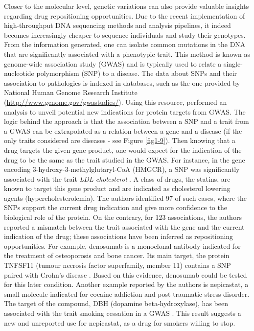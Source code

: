 Closer to the molecular level, genetic variations can also provide valuable insights regarding drug repositioning opportunities. Due to the recent implementation of high-throughput DNA sequencing methods and analysis pipelines, it indeed becomes increasingly cheaper to sequence individuals and study their genotypes. From the information generated, one can isolate common mutations in the DNA that are significantly associated with a phenotypic trait. This method is known as genome-wide association study (GWAS) and is typically used to relate a single-nucleotide polymorphism (SNP) to a disease. The data about SNPs and their association to pathologies is indexed in databases, such as the one provided by National Human Genome Research Institute (\url{http://www.genome.gov/gwastudies/}). Using this resource, \cite{sanseau2012use} performed an analysis to unveil potential new indications for protein targets from GWAS. The logic behind the approach is that the association between a SNP and a trait from a GWAS can be extrapolated as a relation between a gene and a disease (if the only traits considered are diseases - see Figure \ref{fig1-9}). Then knowing that a drug targets the given gene product, one would expect for the indication of the drug to be the same as the trait studied in the GWAS. For instance, in the gene encoding 3-hydroxy-3-methylglutaryl-CoA (HMGCR), a SNP was significantly associated with the trait \emph{LDL cholesterol} \citep{kathiresan2008six}. A class of drugs, the statins, are known to target this gene product and are indicated as cholesterol lowering agents (hypercholesterolemia). The authors identified 97 of such cases, where the SNPs support the current drug indication and give more confidence to the biological role of the protein. On the contrary, for 123 associations, the authors reported a mismatch between the trait associated with the gene and the current indication of the drug; these associations have been inferred as repositioning opportunities. For example, denosumab is a monoclonal antibody indicated for the treatment of osteoporosis and bone cancer. Its main target, the protein TNFSF11 (tumour necrosis factor superfamily, member 11) contains a SNP paired with Crohn's disease \citep{franke2010genome}. Based on this evidence, denosumab could be tested for this later condition. Another example reported by the authors is nepicastat, a small molecule indicated for cocaine addiction and post-traumatic stress disorder. The target of the compound, DBH (dopamine beta-hydroxylase), has been associated with the trait smoking cessation in a GWAS \citep{furberg2010genome}. This result suggests a new and unreported use for nepicastat, as a drug for smokers willing to stop.

